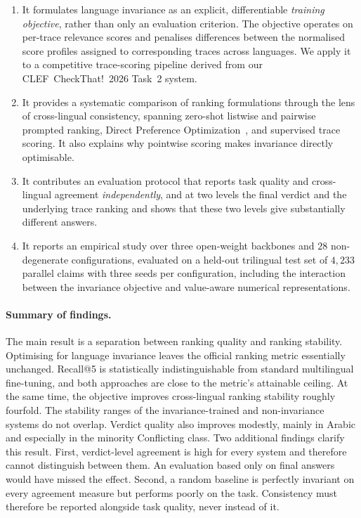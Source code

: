\begin{enumerate}
    \item It formulates language invariance as an explicit, differentiable \emph{training objective},
    rather than only an evaluation criterion. The objective operates on per-trace relevance scores
    and penalises differences between the normalised score profiles assigned to corresponding traces
    across languages. We apply it to a competitive trace-scoring pipeline derived from our
    CLEF~CheckThat!~2026 Task~2 system.
    \item It provides a systematic comparison of ranking formulations through the lens of
    cross-lingual consistency, spanning zero-shot listwise and pairwise prompted ranking, Direct
    Preference Optimization~\cite{rafailov2024directpreferenceoptimizationlanguage}, and supervised
    trace scoring. It also explains why pointwise scoring makes invariance directly optimisable.
    \item It contributes an evaluation protocol that reports task quality and cross-lingual agreement
    \emph{independently}, and at two levels the final verdict and the underlying trace
    ranking and shows that these two levels give substantially different answers.
    \item It reports an empirical study over three open-weight backbones and $28$ non-degenerate
    configurations, evaluated on a held-out trilingual test set of $4{,}233$ parallel claims with
    three seeds per configuration, including the interaction between the invariance objective and
    value-aware numerical representations.
\end{enumerate}

\paragraph{Summary of findings.}
The main result is a separation between ranking quality and ranking stability. Optimising for language
invariance leaves the official ranking metric essentially unchanged. Recall@5 is statistically
indistinguishable from standard multilingual fine-tuning, and both approaches are close to the
metric's attainable ceiling. At the same time, the objective improves cross-lingual ranking stability
roughly fourfold. The stability ranges of the invariance-trained and non-invariance systems do not
overlap. Verdict quality also improves modestly, mainly in Arabic and especially in the minority
\textsf{Conflicting} class. Two additional findings clarify this result. First, verdict-level
agreement is high for every system and therefore cannot distinguish between them. An evaluation based
only on final answers would have missed the effect. Second, a random baseline is perfectly invariant
on every agreement measure but performs poorly on the task. Consistency must therefore be reported
alongside task quality, never instead of it.

